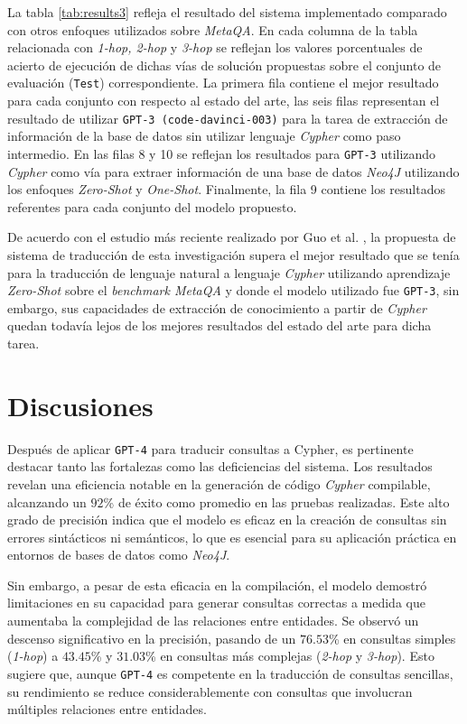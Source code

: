 La tabla \ref{tab:results3} refleja el resultado del sistema implementado comparado con otros enfoques utilizados sobre \textit{MetaQA}. En cada columna de la tabla relacionada con \textit{1-hop, 2-hop} y \textit{3-hop} se reflejan los valores porcentuales de acierto de ejecución de dichas vías de solución propuestas sobre el conjunto de evaluación (\texttt{Test}) correspondiente. La primera fila contiene el mejor resultado para cada conjunto con respecto al estado del arte, las seis filas representan el resultado de utilizar \texttt{GPT-3 (code-davinci-003)} para la tarea de extracción de información de la base de datos sin utilizar lenguaje \textit{Cypher} como paso intermedio. En las filas 8 y 10 se reflejan los resultados para \texttt{GPT-3} utilizando \textit{Cypher} como vía para extraer información de una base de datos \textit{Neo4J} utilizando los enfoques \textit{Zero-Shot} y \textit{One-Shot}. Finalmente, la fila 9 contiene los resultados referentes para cada conjunto del modelo propuesto.

De acuerdo con el estudio más reciente realizado por Guo et al. \cite{gpt4graphpaper2023}, la propuesta de sistema de traducción de esta investigación supera el mejor resultado que se tenía para la traducción de lenguaje natural a lenguaje \textit{Cypher} utilizando aprendizaje \textit{Zero-Shot} sobre el \textit{benchmark MetaQA} y donde el modelo utilizado fue \texttt{GPT-3}, sin embargo, sus capacidades de extracción de conocimiento a partir de \textit{Cypher} quedan todavía lejos de los mejores resultados del estado del arte para dicha tarea.

\section{Discusiones}

Después de aplicar \texttt{GPT-4} para traducir consultas a Cypher, es pertinente destacar tanto las fortalezas como las deficiencias del sistema. Los resultados revelan una eficiencia notable en la generación de código \textit{Cypher} compilable, alcanzando un $92$\% de éxito como promedio en las pruebas realizadas. Este alto grado de precisión indica que el modelo es eficaz en la creación de consultas sin errores sintácticos ni semánticos, lo que es esencial para su aplicación práctica en entornos de bases de datos como \textit{Neo4J}.

Sin embargo, a pesar de esta eficacia en la compilación, el modelo demostró limitaciones en su capacidad para generar consultas correctas a medida que aumentaba la complejidad de las relaciones entre entidades. Se observó un descenso significativo en la precisión, pasando de un $76.53$\% en consultas simples (\textit{1-hop}) a $43.45$\% y $31.03$\% en consultas más complejas (\textit{2-hop} y \textit{3-hop}). Esto sugiere que, aunque \texttt{GPT-4} es competente en la traducción de consultas sencillas, su rendimiento se reduce considerablemente con consultas que involucran múltiples relaciones entre entidades. 

